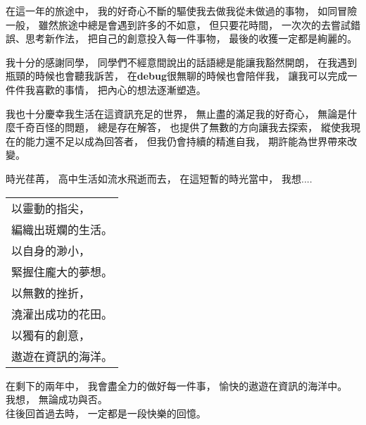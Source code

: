 \documentclass[12pt,oneside]{ctexart}
\begin{document}
\vspace*{2em}
在這一年的旅途中，
我的好奇心不斷的驅使我去做我從未做過的事物，
如同冒險一般，
雖然旅途中總是會遇到許多的不如意，
但只要花時間，
一次次的去嘗試錯誤、思考新作法，
把自己的創意投入每一件事物，
最後的收獲一定都是絢麗的。

\vspace*{2em}
我十分的感謝同學，
同學們不經意間說出的話語總是能讓我豁然開朗，
在我遇到瓶頸的時候也會聽我訴苦，
在\textbf{debug}很無聊的時候也會陪伴我，
讓我可以完成一件件我喜歡的事情，
把內心的想法逐漸塑造。

\vspace*{2em}
我也十分慶幸我生活在這資訊充足的世界，
無止盡的滿足我的好奇心，
無論是什麼千奇百怪的問題，
總是存在解答，
也提供了無數的方向讓我去探索，
縱使我現在的能力還不足以成為回答者，
但我仍會持續的精進自我，
期許能為世界帶來改變。


\vspace*{2em}
\noindent 
時光荏苒，
高中生活如流水飛逝而去，
在這短暫的時光當中，
我想....

\vspace*{2em}
\begin{center}
    
\begin{spacing}{2}
    
\begin{tabular}{l}
以靈動的指尖， \\
編織出斑斕的生活。 \\
以自身的渺小，\\
緊握住龐大的夢想。 \\
以無數的挫折，\\
澆灌出成功的花田。 \\
以獨有的創意， \\
遨遊在資訊的海洋。 \\
\end{tabular}
\end{spacing}
\end{center}

\vspace*{2em}
\noindent
在剩下的兩年中，
我會盡全力的做好每一件事，
愉快的遨遊在資訊的海洋中。\\
我想，
無論成功與否。\\
往後回首過去時，
一定都是一段快樂的回憶。
\end{document}
